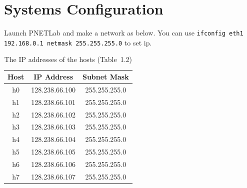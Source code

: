 \documentclass{UTNetLab}
\begin{document}
\part{Systems Configuration}
Launch PNETLab and make a network as below.
You can use \lstinline[emph={eth0}]{ifconfig eth1 192.168.0.1 netmask 255.255.255.0} to set ip.
\begin{center}
    \begin{minipage}{0.48\textwidth}
        \begin{flushleft}
            \begin{table}[H]
                \caption{The IP addresses of the hosts (Table~1.2)}
                \centering
                \begin{tabular}{ c c c }
                    \hline \hline
                    Host & IP Address     & Subnet Mask   \\
                    \hline
                    h0   & 128.238.66.100 & 255.255.255.0 \\
                    h1   & 128.238.66.101 & 255.255.255.0 \\
                    h2   & 128.238.66.102 & 255.255.255.0 \\
                    h3   & 128.238.66.103 & 255.255.255.0 \\
                    h4   & 128.238.66.104 & 255.255.255.0 \\
                    h5   & 128.238.66.105 & 255.255.255.0 \\
                    h6   & 128.238.66.106 & 255.255.255.0 \\
                    h7   & 128.238.66.107 & 255.255.255.0 \\
                    \hline \hline
                \end{tabular}
            \end{table}
        \end{flushleft}
    \end{minipage}
    \begin{minipage}{0.48\textwidth}
        \begin{flushright}
            \begin{figure}[H]
                \centering
\end{figure}
\end{flushright}
\end{minipage}
\end{center}
\end{document}

